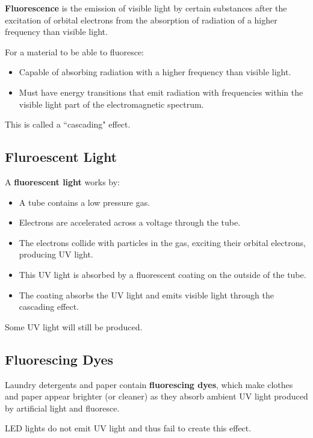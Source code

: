 \documentclass[a4paper,11pt]{report}
\begin{document}
\textbf{Fluorescence} is the emission of visible light by certain substances
after the excitation of orbital electrons from the absorption of radiation of
a higher frequency than visible light.

For a material to be able to fluoresce:

\begin{itemize}
\item Capable of absorbing radiation with a higher frequency than visible light.
\item Must have energy transitions that emit radiation with frequencies within
	the visible light part of the electromagnetic spectrum.
\end{itemize}

This is called a ``cascading" effect.

\subsection{Fluroescent Light}


A \textbf{fluorescent light} works by:

\begin{itemize}
\item A tube contains a low pressure gas.
\item Electrons are accelerated across a voltage through the tube.
\item The electrons collide with particles in the gas, exciting their orbital
	electrons, producing UV light.
\item This UV light is absorbed by a fluorescent coating on the outside of the
	tube.
\item The coating absorbs the UV light and emits visible light through the
	cascading effect.
\end{itemize}

Some UV light will still be produced.

\subsection{Fluorescing Dyes}

Laundry detergents and paper contain \textbf{fluorescing dyes}, which make
clothes and paper appear brighter (or cleaner) as they absorb ambient UV light
produced by artificial light and fluoresce.

LED lights do not emit UV light and thus fail to create this effect.
\end{document}
